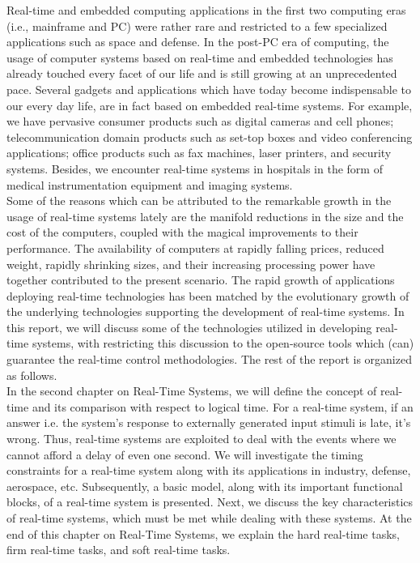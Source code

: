 \documentclass[12pt]{report}
\begin{document}
Real-time and embedded computing applications in the first two computing eras (i.e., mainframe and PC) were rather rare and restricted to a few specialized applications such as space and defense. In the post-PC era of computing, the usage of computer systems based on real-time and embedded technologies has already touched every facet of our life and is still growing at an unprecedented pace. Several gadgets and applications which have today become indispensable to our every day life, are in fact based on embedded real-time systems. For example, we have pervasive consumer products such as digital cameras and cell phones; telecommunication domain products such as set-top boxes and video conferencing applications; office products such as fax machines, laser printers, and security systems. Besides, we encounter real-time systems in hospitals in the form of medical instrumentation equipment and imaging systems. \\

Some of the reasons which can be attributed to the remarkable growth in the usage of real-time systems lately are the manifold reductions in the size and the cost of the computers, coupled with the magical improvements to their performance. The availability of computers at rapidly falling prices, reduced weight, rapidly shrinking sizes, and their increasing processing power have together contributed to the present scenario. The rapid growth of applications deploying real-time technologies has been matched by the evolutionary growth of the underlying technologies supporting the development of real-time systems. In this report, we will discuss some of the technologies utilized in developing real-time systems, with restricting this discussion to the open-source tools which (can) guarantee the real-time control methodologies. The rest of the report is organized as follows. \\ 

In the second chapter on Real-Time Systems, we will define the concept of real-time and its comparison with respect to logical time. For a real-time system, if an answer i.e. the system's response to externally generated input stimuli is late, it's wrong. Thus, real-time systems are exploited to deal with the events where we cannot afford a delay of even one second. We will investigate the timing constraints for a real-time system along with its applications in industry, defense, aerospace, etc. Subsequently, a basic model, along with its important functional blocks, of a real-time system is presented. Next, we discuss the key characteristics of real-time systems, which must be met while dealing with these systems. At the end of this chapter on Real-Time Systems, we explain the hard real-time tasks, firm real-time tasks, and soft real-time tasks. \\ 
\end{document}

